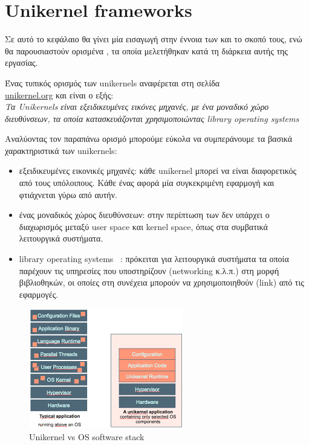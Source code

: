 \chapter{Unikernel frameworks}
\label{chap:unikernels}

Σε αυτό το κεφάλαιο θα γίνει μία εισαγωγή στην έννοια των  και το
σκοπό τους, ενώ θα παρουσιαστούν ορισμένα , τα οποία
μελετήθηκαν κατά τη διάρκεια αυτής της εργασίας. 

Ένας τυπικός ορισμός των unikernels αναφέρεται στη σελίδα \\
\href{http://unikernel.org/}{unikernel.org} και είναι ο εξής: 
\vspace{1ex}
\\
\textit{Τα Unikernels είναι εξειδικευμένες εικόνες μηχανές, με ένα
μοναδικό χώρο διευθύνσεων, τα οποία κατασκευάζονται χρησιμοποιώντας library
operating systems} \\
\vspace{1ex}

Αναλύοντας τον παραπάνω ορισμό μπορούμε εύκολα να συμπεράνουμε τα βασικά
χαρακτηριστικά των unikernels:
\begin{itemize}
	\item εξειδικευμένες εικονικές μηχανές: κάθε unikernel μπορεί να είναι
	διαφορετικός από τους υπόλοιπους. Κάθε ένας αφορά μία συγκεκριμένη
		εφαρμογή και φτιάχνεται γύρω από αυτήν.
	\item ένας μοναδικός χώρος διευθύνσεων: στην περίπτωση των 
		δεν υπάρχει ο διαχωρισμός μεταξύ user space και kernel space, όπως
		στα συμβατικά λειτουργικά συστήματα.
	\item library operating systems ~\cite{porter2011rethinking}: πρόκειται
		για λειτουργικά συστήματα τα οποία παρέχουν τις υπηρεσίες που
		υποστηρίζουν (networking κ.λ.π.) στη μορφή βιβλιοθηκών, οι
		οποίες στη συνέχεια μπορούν να χρησιμοποιηθούν (link) από τις
		εφαρμογές. 
\end{itemize}

\begin{figure}[htp]
\centering
\includegraphics[scale=1]{figures/unikernel_vs_os.png}
\caption{Unikernel vs OS software stack\label{fig3_1}}
\end{figure}

